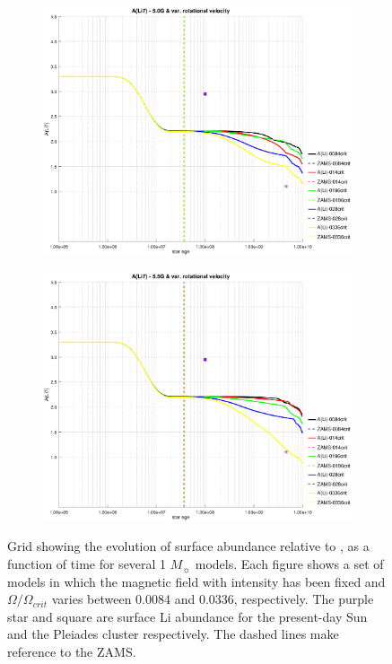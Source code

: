\documentclass[fleqn,usenatbib]{mnras}
\begin{document}
\begin{figure}
    \begin{subfigure}[h]{0.47\textwidth}
    \includegraphics[trim = 40mm 15mm 20mm 15mm, clip,width=\textwidth]{figures/li_var_vel_5_0g.eps}
    \label{fig:subim5}
    \end{subfigure}
    \begin{subfigure}[h]{0.47\textwidth}
    \includegraphics[trim = 40mm 15mm 20mm 15mm, clip,width=\textwidth]{figures/li_var_vel_5_5g.eps}
    \label{fig:subim6}
    \end{subfigure}
\caption{Grid showing the evolution of surface  abundance relative to , as a function of time for several 1 $M_{\sun}$ models. Each figure shows a set of models in which the magnetic field with intensity has been fixed and $\Omega / \Omega_{crit}$ varies between 0.0084 and 0.0336, respectively. The purple star and square are surface Li abundance for the present-day Sun \citep{Asplund2009} and the Pleiades cluster \citep{Sestito2005} respectively. The dashed lines make reference to the ZAMS.}
\label{fig:grid_li_var_vel}
\end{figure}
\par
\end{document}
